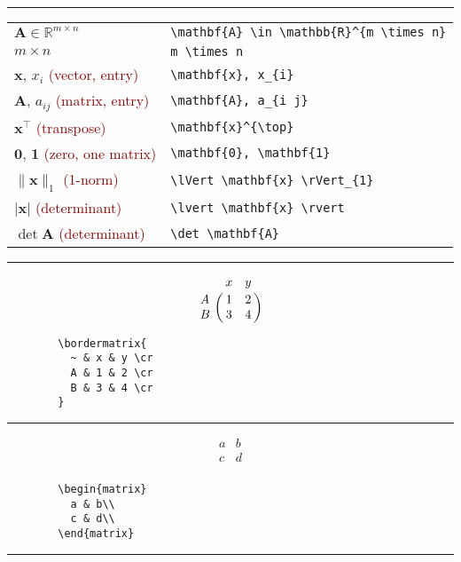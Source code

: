 \documentclass[a4paper,10pt,landscape]{article}
\newcommand{\hSep}{{\color{colorSep}\hrule}}
\theoremstyle{definition}
\theoremstyle{remark}
\newcommand{\hDesc}[1]{\textcolor{darkred}{(#1)}} %
\begin{document}
\begin{multicols}{3}
\hSep
\begin{tabular}{@{}ll@{}}
	$\mathbf{A} \in \mathbb{R}^{m \times n}$	&\verb!\mathbf{A} \in \mathbb{R}^{m \times n}!\\
	$m \times n$	&\verb!m \times n!\\
	$\mathbf{x}$, $x_{i}$	\hDesc{vector, entry}	&\verb!\mathbf{x}, x_{i}!\\
	$\mathbf{A}$, $a_{i j}$	\hDesc{matrix, entry}	&\verb!\mathbf{A}, a_{i j}!\\
	$\mathbf{x}^{\top}$	\hDesc{transpose}	&\verb!\mathbf{x}^{\top}!\\
	$\mathbf{0}$, $\mathbf{1}$	\hDesc{zero, one matrix}	&\verb!\mathbf{0}, \mathbf{1}!\\
	$\lVert \mathbf{x} \rVert_{1}$	\hDesc{1-norm}	&\verb!\lVert \mathbf{x} \rVert_{1}!\\
	$\lvert \mathbf{x} \rvert$	\hDesc{determinant}	&\verb!\lvert \mathbf{x} \rvert!\\
	$\det \mathbf{A}$	\hDesc{determinant}		&\verb!\det \mathbf{A}!\\
\end{tabular}
\hSep
\begin{multicols}{2}
	\[
		\bordermatrix{
		  ~ & x & y \cr
		  A & 1 & 2 \cr
		  B & 3 & 4 \cr
		}
	\]
\columnbreak
	\begin{verbatim}
		\bordermatrix{
		  ~ & x & y \cr
		  A & 1 & 2 \cr
		  B & 3 & 4 \cr
		}
	\end{verbatim}
\end{multicols}
\hSep
\begin{multicols}{2}
	\[
		\begin{matrix}  
		  a & b\\
		  c & d\\
		\end{matrix}
	\]
\columnbreak
	\begin{verbatim}
		\begin{matrix}  
		  a & b\\
		  c & d\\
		\end{matrix}
	\end{verbatim}
\end{multicols}
\hSep
\begin{multicols}{2}

\end{multicols}
\end{multicols}
\end{document}
